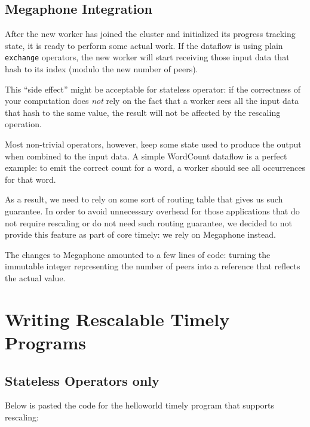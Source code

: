 \documentclass[12pt]{extarticle}
\begin{document}
\subsection{Megaphone Integration}

After the new worker has joined the cluster and initialized its progress tracking state, it is ready to perform some actual
work. If the dataflow is using plain \verb|exchange| operators, the new worker will start receiving those input data
that hash to its index (modulo the new number of peers).

This ``side effect'' might be acceptable for stateless operator: if the correctness of your computation does \textit{not}
rely on the fact that a worker sees all the input data that hash to the same value, the result will not be affected by the
rescaling operation.

Most non-trivial operators, however, keep some state used to produce the output when combined to the input data.
A simple WordCount dataflow is a perfect example: to emit the correct count for a word,
a worker should see all occurrences for that word.

As a result, we need to rely on some sort of routing table that gives us such guarantee.
In order to avoid unnecessary overhead for those applications that do not require rescaling or do not need such routing
guarantee, we decided to not provide this feature as part of core timely: we rely on Megaphone instead.

The changes to Megaphone amounted to a few lines of code: turning the immutable integer representing the number of peers
into a reference that reflects the actual value. 

\section{Writing Rescalable Timely Programs}

\subsection{Stateless Operators only}

Below is pasted the code for the helloworld timely program that supports rescaling:
\end{document}
